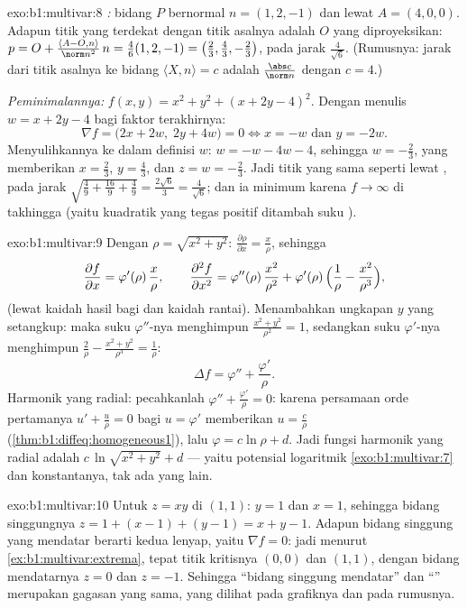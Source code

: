 \begin{solution}{exo:b1:multivar:8}
\emph{:} bidang $P$ bernormal $n = (1, 2, -1)$ dan
lewat $A = (4, 0, 0)$. Adapun titik yang terdekat dengan titik asalnya adalah
$O$ yang diproyeksikan: $p = O + \frac{\langle A - O, n\rangle}{\norm
n^2}\,n = \frac{4}{6}(1,2,-1) = \bigl(\frac23, \frac43,
-\frac23\bigr)$, pada jarak $\frac{4}{\sqrt 6}$. (Rumusnya: jarak
dari titik asalnya ke bidang $\langle X, n \rangle = c$ adalah
$\frac{\abs c}{\norm n}$ dengan $c = 4$.)

\emph{Peminimalannya:} $f(x,y) = x^2 + y^2 + (x + 2y - 4)^2$. Dengan menulis
$w = x + 2y - 4$ bagi faktor terakhirnya:
\[
\nabla f = \bigl(2x + 2w,\; 2y + 4w\bigr) = 0
\iff x = -w \text{ dan } y = -2w .
\]
Menyulihkannya ke dalam definisi $w$: $w = -w - 4w - 4$, sehingga $w =
-\frac23$, yang memberikan $x = \frac23$, $y = \frac43$, dan $z = w =
-\frac23$. Jadi titik yang sama seperti lewat , pada jarak
$\sqrt{\frac49 + \frac{16}{9} + \frac49} = \frac{2\sqrt 6}{3} =
\frac{4}{\sqrt6}$; dan ia minimum karena $f \to \infty$ di takhingga
(yaitu kuadratik yang tegas positif ditambah suku ).
\end{solution}

\begin{solution}{exo:b1:multivar:9}
Dengan $\rho = \sqrt{x^2+y^2}$: $\frac{\partial \rho}{\partial x} =
\frac{x}{\rho}$, sehingga
\[
\frac{\partial f}{\partial x} = \varphi'(\rho)\,\frac{x}{\rho},
\qquad
\frac{\partial^2 f}{\partial x^2}
= \varphi''(\rho)\,\frac{x^2}{\rho^2}
+ \varphi'(\rho)\,\Bigl(\frac{1}{\rho} -
\frac{x^2}{\rho^3}\Bigr),
\]
(lewat kaidah hasil bagi dan kaidah rantai). Menambahkan ungkapan $y$ yang setangkup:
maka suku $\varphi''$-nya menghimpun $\frac{x^2 + y^2}{\rho^2} = 1$, sedangkan
suku $\varphi'$-nya menghimpun $\frac{2}{\rho} - \frac{x^2 +
y^2}{\rho^3} = \frac{1}{\rho}$:
\[
\Delta f = \varphi'' + \frac{\varphi'}{\rho} .
\]
Harmonik yang radial: pecahkanlah $\varphi'' + \frac{\varphi'}{\rho} = 0$: karena
persamaan orde pertamanya $u' + \frac u\rho = 0$ bagi $u = \varphi'$
memberikan $u = \frac{c}{\rho}$ (\cref{thm:b1:diffeq:homogeneous1}),
lalu $\varphi = c\ln\rho + d$. Jadi fungsi harmonik yang radial adalah
$c\,\ln\sqrt{x^2 + y^2} + d$ --- yaitu potensial logaritmik
\cref{exo:b1:multivar:7} dan konstantanya, tak ada yang lain.
\end{solution}

\begin{solution}{exo:b1:multivar:10}
Untuk $z = xy$ di $(1,1)$:  $y = 1$ dan $x = 1$, sehingga bidang
singgungnya $z = 1 + (x - 1) + (y - 1) = x + y - 1$. Adapun bidang singgung
yang mendatar berarti kedua  lenyap, yaitu $\nabla f = 0$:
jadi menurut \cref{ex:b1:multivar:extrema}, tepat titik kritisnya
$(0, 0)$ dan $(1, 1)$, dengan bidang mendatarnya $z = 0$ dan $z =
-1$. Sehingga ``bidang singgung mendatar'' dan ``'' merupakan
gagasan yang sama, yang dilihat pada grafiknya dan pada rumusnya.
\end{solution}

